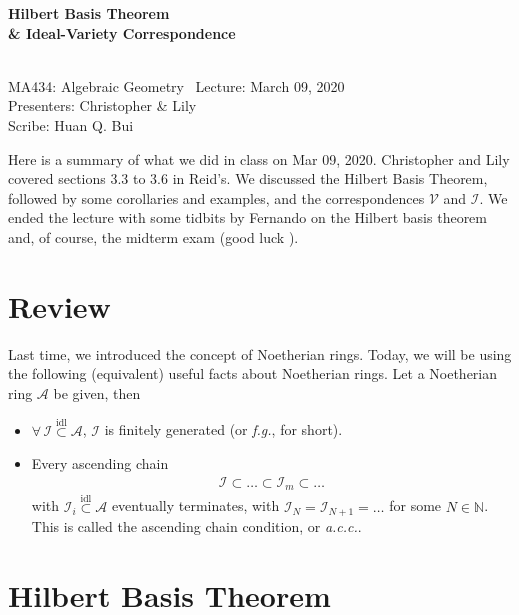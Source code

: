 \documentclass[12pt]{article}
\begin{document}
\begin{center}
	\LARGE{\textbf{Hilbert Basis Theorem \\\& Ideal-Variety Correspondence}}
	
	
	\noindent \hrulefill\\
	\small{MA434: Algebraic Geometry \textemdash$\,$  Lecture: March 09, 2020}\\
	\small{Presenters: Christopher \& Lily} \\
	\small{Scribe: Huan Q. Bui}\\\vspace{-6pt}
	\hrulefill
\end{center}

Here is a summary of what we did in class on Mar 09, 2020. Christopher and Lily covered sections 3.3 to 3.6 in Reid's. We discussed the Hilbert Basis Theorem, followed by some corollaries and examples, and the correspondences $\mathcal{V}$ and $\mathcal{I}$. We ended the lecture with some tidbits by Fernando on the Hilbert basis theorem and, of course, the midterm exam (good luck \smiley{}). 


\section{Review}

Last time, we introduced the concept of Noetherian rings. Today, we will be using the following (equivalent) useful facts about Noetherian rings. Let a Noetherian ring $\mathcal{A}$ be given, then
\begin{itemize}
	\item $\forall\,\mathcal{I} \overset{\text{idl}}{\subset} \mathcal{A}$, $\mathcal{I}$ is finitely generated (or \textit{f.g.}, for short). 
	\item Every ascending chain 
	\begin{align*}
	\mathcal{I} \subset \dots \subset \mathcal{I}_m \subset \dots
	\end{align*}
	with $\mathcal{I}_i \overset{\text{idl}}{\subset}\mathcal{A}$ eventually terminates, with $\mathcal{I}_N = \mathcal{I}_{N+1} = \dots$ for some $N \in \mathbb{N}$. This is called the ascending chain condition, or \textit{a.c.c.}.
\end{itemize} 


\section{Hilbert Basis Theorem}
\end{document}
